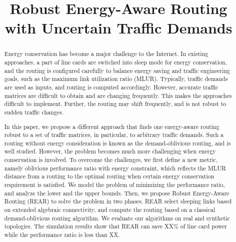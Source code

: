 \documentclass[conference]{IEEEtran}
\begin{document}
\title{Robust Energy-Aware Routing with Uncertain Traffic Demands}


\author{
\and
{}
\and
{}
}


\maketitle

\begin{abstract}
Energy conservation has become a major challenge to the Internet. In existing approaches, a part of line cards 
are switched into sleep mode for energy conservation, and the routing is configured carefully to balance energy saving 
and traffic engineering goals, such as the maximum link utilization ratio (MLUR). Typically, traffic demands are 
used as inputs, and routing is computed accordingly. However, accurate traffic matrices are difficult to obtain and 
are changing frequently. This makes the approaches difficult to implement. Further, the routing may shift 
frequently, and is not robust to sudden traffic changes.

In this paper, we propose a different approach that finds one energy-aware routing robust to a set of traffic 
matrices, in particular, to arbitrary traffic demands. Such a routing without energy consideration is known as 
the demand-oblivious routing, and is well studied. However, the problem becomes much more challenging when energy 
conservation is involved. To overcome the challenges, we first define a new metric, namely oblivious performance 
ratio with energy constraint, which reflects the MLUR distance from a routing to the optimal routing when 
certain energy conservation requirement is satisfied. We model the problem of minimizing the performance ratio, 
and analyze the lower and the upper bounds. Then, we propose Robust Energy-Aware Routing (REAR) to solve 
the problem in two phases. REAR select sleeping links based on extended algebraic connectivity, and compute the 
routing based on a classical demand-oblivious routing algorithm. We evaluate our algorithms on real and 
synthetic topologies. The simulation results show that REAR can save XX\% of line card power while the performance 
ratio is less than XX.
\end{abstract}
\end{document}
